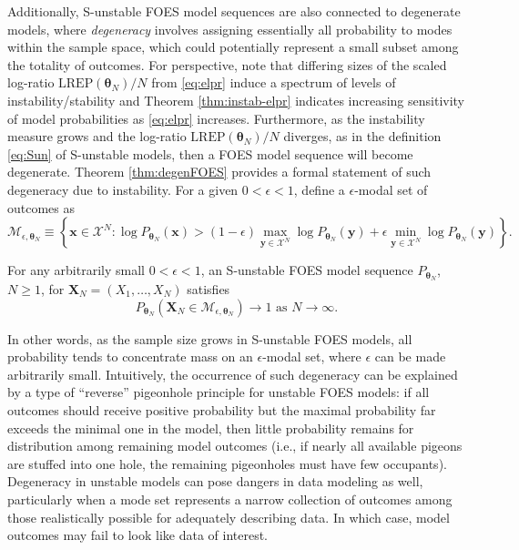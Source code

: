 \documentclass[]{article}
\theoremstyle{definition}
\newcommand{\REP}{\mathrm{LREP}}
\let\BeginKnitrBlock\begin \let\EndKnitrBlock\end
\begin{document}
Additionally, S-unstable FOES model sequences are also connected to
degenerate models, where \emph{degeneracy} involves assigning
essentially all probability to modes within the sample space, which
could potentially represent a small subset among the totality of
outcomes. For perspective, note that differing sizes of the scaled
log-ratio \(\REP(\boldsymbol \theta_N)/N\) from \eqref{eq:elpr} induce a
spectrum of levels of instability/stability and Theorem
\ref{thm:instab-elpr} indicates increasing sensitivity of model
probabilities as \eqref{eq:elpr} increases. Furthermore, as the
instability measure grows and the log-ratio
\(\REP(\boldsymbol \theta_N)/N\) diverges, as in the definition
\eqref{eq:Sun} of S-unstable models, then a FOES model sequence will
become degenerate. Theorem \ref{thm:degenFOES} provides a formal
statement of such degeneracy due to instability. For a given
\(0 < \epsilon < 1\), define a \(\epsilon\)-modal set of outcomes as
\begin{equation}
\label{eq:mode}
\mathcal{M}_{\epsilon, \boldsymbol \theta_N} \equiv \left\{\boldsymbol x \in \mathcal{X}^N: \log P_{\boldsymbol \theta_N}(\boldsymbol x) > (1-\epsilon)\max\limits_{\boldsymbol y \in \mathcal{X}^N} \log  P_{\boldsymbol \theta_N}(\boldsymbol y) + \epsilon\min\limits_{\boldsymbol y \in \mathcal{X}^N} \log P_{\boldsymbol \theta_N}(\boldsymbol y) \right\}.
\end{equation}
\BeginKnitrBlock{theorem}
\protect\hypertarget{thm:degenFOES}{}{\label{thm:degenFOES}}For any
arbitrarily small \(0 < \epsilon < 1\), an S-unstable FOES model
sequence \(P_{\boldsymbol \theta_N}\), \(N \geq 1\), for
\(\boldsymbol X_N=(X_1, \dots, X_N)\) satisfies \[
P_{\boldsymbol \theta_N}\left( \boldsymbol X_N\in \mathcal{M}_{\epsilon, \boldsymbol \theta_N}\right) \rightarrow 1 \text{ as } N \rightarrow \infty.
\]
\EndKnitrBlock{theorem}

In other words, as the sample size grows in S-unstable FOES models, all
probability tends to concentrate mass on an \(\epsilon\)-modal set,
where \(\epsilon\) can be made arbitrarily small. Intuitively, the
occurrence of such degeneracy can be explained by a type of ``reverse''
pigeonhole principle for unstable FOES models: if all outcomes should
receive positive probability but the maximal probability far exceeds the
minimal one in the model, then little probability remains for
distribution among remaining model outcomes (i.e., if nearly all
available pigeons are stuffed into one hole, the remaining pigeonholes
must have few occupants). Degeneracy in unstable models can pose dangers
in data modeling as well, particularly when a mode set represents a
narrow collection of outcomes among those realistically possible for
adequately describing data. In which case, model outcomes may fail to
look like data of interest.
\end{document}
